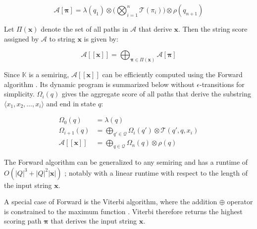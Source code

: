 \begin{equation}
  \mathcal{A}[\pmb{\pi}] = \lambda(q_1) \otimes \Bigg( \bigotimes_{i=1}^n \mathcal{T}(\pi_i) \Bigg) \otimes \rho(q_{n+1})
\end{equation}

\begin{definition}
\label{def:string-score}
Let $\Pi(\pmb{x})$ denote the set of all paths in $\mathcal{A}$ that derive $\pmb{x}$. Then the string score assigned by $\mathcal{A}$ to string $\pmb{x}$ is given by:
  
\end{definition}

\begin{equation}
  \mathcal{A}[\![\pmb{x}]\!] = \bigoplus_{\pmb{\pi} \in \Pi(\pmb{x})} \mathcal{A}[\pmb{\pi}]
\end{equation}

\begin{remark}
  Since $\mathbb{K}$ is a semiring, $\mathcal{A}[\![\pmb{x}]\!]$ can be efficiently computed using the Forward algorithm \citep{baum1966statistical}. Its dynamic program is summarized below without $\epsilon$-transitions for simplicity. $\Omega_i(q)$ gives the aggregate score of all paths that derive the substring $\langle x_1, x_2, \dots, x_i \rangle$ and end in state $q$:
 
\begin{subequations}
  \begin{align}
    \Omega_0(q) &= \lambda(q) \\
    \Omega_{i+1}(q) &= \bigoplus_{q' \in \mathcal{Q}} \Omega_i(q') \otimes \mathcal{T}(q',q,x_i)  \\
    \mathcal{A}[\![\pmb{x}]\!] &= \bigoplus_{q \in \mathcal{Q}} \Omega_n(q) \otimes \rho(q)
  \end{align}
\end{subequations}

\end{remark}

\begin{remark}
  \label{rmk:old-runtime}
  The Forward algorithm can be generalized to any semiring \citep{eisner2002parameter} and has a runtime of $O(|Q|^3 + |Q|^2|\pmb{x}|)$ \citep{schwartz2018sopa}; notably with a linear runtime with respect to the length of the input string $\pmb{x}$.
\end{remark}

\begin{remark}
  A special case of Forward is the Viterbi algorithm, where the addition $\oplus$ operator is constrained to the maximum function \citep{viterbi1967error}. Viterbi therefore returns the highest scoring path $\pmb{\pi}$ that derives the input string $\pmb{x}$.
\end{remark}

